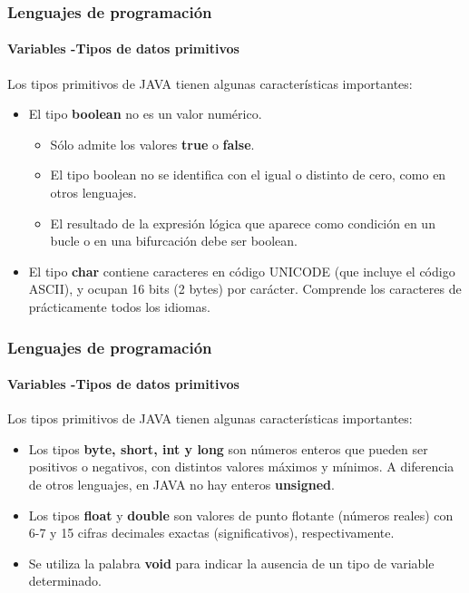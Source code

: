 \documentclass{beamer}
\begin{document}
		\begin{frame}
			\frametitle{Lenguajes de programaci\'on} 
			\framesubtitle{Variables -Tipos de datos primitivos}

			Los tipos primitivos de JAVA tienen algunas caracter\'isticas importantes:

			\begin{itemize}
				\item El tipo \textbf{boolean} no es un valor num\'erico.
				\begin{itemize}
					\item S\'olo admite los valores \textbf{true} o \textbf{false}. 
					\item El tipo boolean no se identifica con el igual o distinto de cero, como en otros lenguajes.
					\item El resultado de la expresi\'on l\'ogica que aparece como condici\'on en un bucle o en una bifurcaci\'on debe ser boolean.
				\end{itemize}
				\item El tipo \textbf{char} contiene caracteres en c\'odigo UNICODE (que incluye el c\'odigo ASCII), y ocupan 16 bits (2 bytes) por car\'acter. Comprende los caracteres de pr\'acticamente todos los idiomas.
			\end{itemize}
		\end{frame}
		
		\begin{frame}
			\frametitle{Lenguajes de programaci\'on} 
			\framesubtitle{Variables -Tipos de datos primitivos}

			Los tipos primitivos de JAVA tienen algunas caracter\'isticas importantes:

			\begin{itemize}
				\item Los tipos \textbf{byte, short, int y long} son n\'umeros enteros que pueden ser positivos o negativos, con distintos valores m\'aximos y m\'inimos. A diferencia de otros lenguajes, en JAVA no hay enteros \textbf{unsigned}.
				\item Los tipos \textbf{float} y \textbf{double} son valores de punto flotante (n\'umeros reales) con 6-7 y 15 cifras decimales exactas (significativos), respectivamente.
				\item Se utiliza la palabra 	\textbf{void} para indicar la ausencia de un tipo de variable determinado.
			\end{itemize}
		\end{frame}
		
\end{document}
